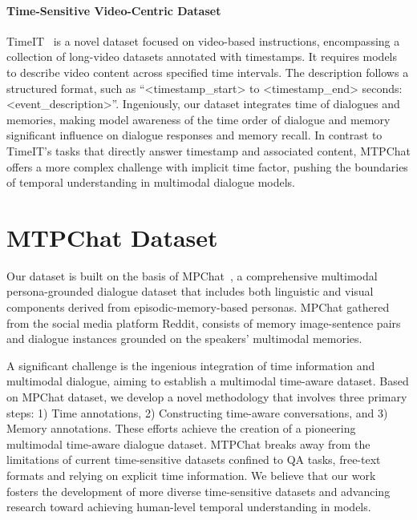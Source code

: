 \paragraph{Time-Sensitive Video-Centric Dataset}

TimeIT~\cite{ren2023timechat} is a novel dataset focused on video-based instructions, encompassing a collection of long-video datasets annotated with timestamps. It requires models to describe video content across specified time intervals. The description follows a structured format, such as ``<timestamp\_start> to <timestamp\_end> seconds: <event\_description>''. 
Ingeniously, our dataset integrates time of dialogues and memories, making model awareness of the time order of dialogue and memory significant influence on dialogue responses and memory recall. In contrast to TimeIT's tasks that directly answer timestamp and associated content, MTPChat offers a more complex challenge with implicit time factor, pushing the boundaries of temporal understanding in multimodal dialogue models.

\section{MTPChat Dataset}

Our dataset is built on the basis of MPChat~\cite{ahn2023mpchat}, a comprehensive multimodal persona-grounded dialogue dataset that includes both linguistic and visual components derived from episodic-memory-based personas. MPChat gathered from the social media platform Reddit, consists of memory image-sentence pairs and dialogue instances grounded on the speakers' multimodal memories. 

A significant challenge is the ingenious integration of time information and multimodal dialogue, aiming to establish a multimodal time-aware dataset. Based on MPChat dataset, we develop a novel methodology that involves three primary steps: 1) Time annotations, 2) Constructing time-aware conversations, and 3) Memory annotations. These efforts achieve the creation of a pioneering multimodal time-aware dialogue dataset. MTPChat breaks away from the limitations of current time-sensitive datasets confined to QA tasks, free-text formats and relying on explicit time information. We believe that our work fosters the development of more diverse time-sensitive datasets and advancing research toward achieving human-level temporal understanding in models.

